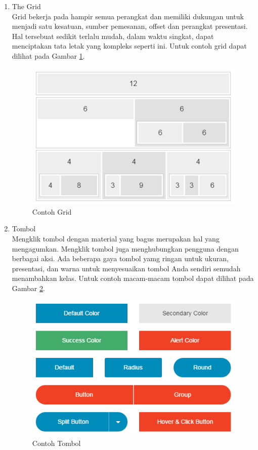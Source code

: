 \begin{enumerate}
\begin{enumerate}
\item The Grid\\
Grid bekerja pada hampir semua perangkat dan memiliki dukungan untuk menjadi satu kesatuan, sumber pemesanan, offset dan perangkat presentasi. Hal tersebuat sedikit terlalu mudah, dalam waktu singkat, dapat menciptakan tata letak yang kompleks seperti ini. Untuk contoh grid dapat dilihat pada Gambar \ref{fig:grid}.

\begin{figure}[H]
\centering
\includegraphics[scale=1]{Gambar/grid.png}
\caption[Gambar Contoh Grid]{Contoh Grid}
\label{fig:grid}
\end{figure}

\item Tombol\\
Mengklik tombol dengan material yang bagus merupakan hal yang mengagumkan. Mengklik tombol juga menghubungkan pengguna dengan berbagai aksi. Ada beberapa gaya tombol yamg ringan untuk ukuran, presentasi, dan warna untuk menyesuaikan tombol Anda sendiri semudah menambahkan kelas. Untuk contoh macam-macam tombol dapat dilihat pada Gambar \ref{fig:button}.

\begin{figure}[H]
\centering
\includegraphics[scale=1]{Gambar/button.png}
\caption[Gambar Contoh Tombol]{Contoh Tombol}
\label{fig:button}
\end{figure}


\end{enumerate}
\end{enumerate}
